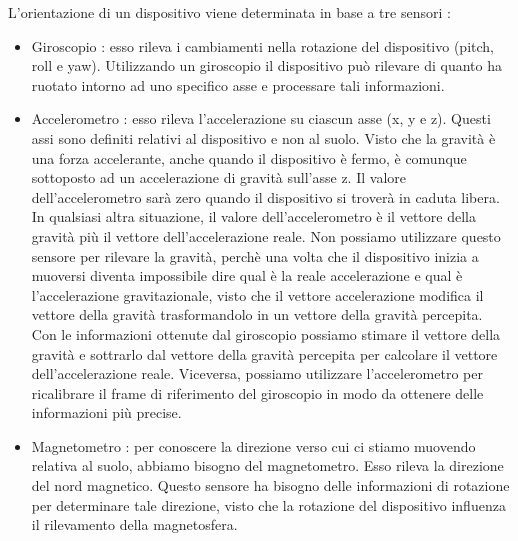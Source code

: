 L’orientazione di un dispositivo viene determinata in base a tre sensori :
\begin{itemize}
\item Giroscopio : esso rileva i cambiamenti nella rotazione del dispositivo (pitch, roll e yaw). Utilizzando un giroscopio il dispositivo può rilevare di quanto ha ruotato intorno ad uno specifico asse e processare tali informazioni.
\item Accelerometro : esso rileva l’accelerazione su ciascun asse (x, y e z). Questi assi sono definiti relativi al dispositivo e non al suolo. Visto che la gravità è una forza accelerante, anche quando il dispositivo è fermo, è comunque sottoposto ad un accelerazione di gravità sull’asse z. Il valore dell’accelerometro sarà zero quando il dispositivo si troverà in caduta libera. In qualsiasi altra situazione, il valore dell’accelerometro è il vettore della gravità più il vettore dell’accelerazione reale. Non possiamo utilizzare questo sensore per rilevare la gravità, perchè una volta che il dispositivo inizia a muoversi diventa impossibile dire qual è la reale accelerazione e qual è l’accelerazione gravitazionale, visto che il vettore accelerazione modifica il vettore della gravità trasformandolo in un vettore della gravità percepita. Con le informazioni ottenute dal giroscopio possiamo stimare il vettore della gravità e sottrarlo dal vettore della gravità percepita per calcolare il vettore dell’accelerazione reale. Viceversa, possiamo utilizzare l’accelerometro per ricalibrare il frame di riferimento del giroscopio in modo da ottenere delle informazioni più precise.
\item Magnetometro : per conoscere la direzione verso cui ci stiamo muovendo relativa al suolo, abbiamo bisogno del magnetometro. Esso rileva la direzione del nord magnetico. Questo sensore ha bisogno delle informazioni di rotazione per determinare tale direzione, visto che la rotazione del dispositivo influenza il rilevamento della magnetosfera.
\end{itemize}
